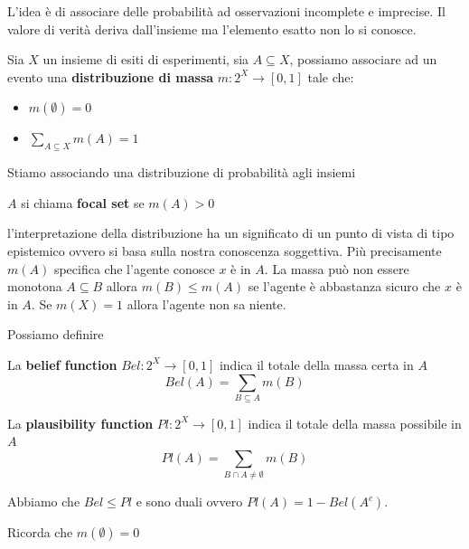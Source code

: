 L'idea è di associare delle probabilità ad osservazioni incomplete e imprecise.
Il valore di verità deriva dall'insieme ma l'elemento esatto non lo si conosce.

\begin{definizione}
    Sia $X$ un insieme di esiti di esperimenti, sia $A\subseteq X$, possiamo associare
    ad un evento una \textbf{distribuzione di massa} $m:2^X\to [0,1]$ tale che:
    \begin{itemize}
        \item $m(\emptyset) = 0$
        \item $\sum_{A\subseteq X}m(A) = 1$
    \end{itemize}
\end{definizione}

Stiamo associando una distribuzione di probabilità agli insiemi

\begin{definizione}
    $A$ si chiama \textbf{focal set} se $m(A)>0$ 
\end{definizione}

\begin{nota}
    l'interpretazione della distribuzione ha un significato di un punto di vista 
    di tipo  epistemico ovvero si basa sulla nostra conoscenza soggettiva. Più precisamente $m(A)$ specifica che l'agente 
    conosce $x$ è in $A$. La massa può non essere monotona $A\subseteq B$ allora 
    $m(B)\le m(A) $ se l'agente è abbastanza sicuro che $x$ è in $A$. Se $m(X)=1$
    allora l'agente non sa niente. 
\end{nota}

Possiamo definire
\begin{definizione}
    La \textbf{belief function} $Bel:2^X\to [0,1]$ indica il totale della massa certa in $A$
    $$Bel(A) = \sum_{B\subseteq A} m(B)$$
\end{definizione}
\begin{definizione}
    La \textbf{plausibility function} $Pl:2^X\to [0,1]$ indica il totale della massa possibile in $A$
    $$Pl(A) = \sum_{B\cap A \ne \emptyset} m(B)$$
\end{definizione} 

Abbiamo che $Bel\le Pl$ e sono duali ovvero $Pl(A) = 1- Bel(A^c)$.

\begin{nota}
    Ricorda che $m(\emptyset) = 0$
\end{nota}

